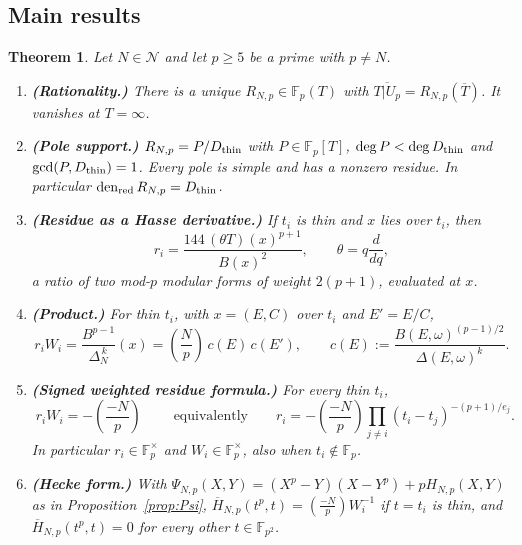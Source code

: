 \documentclass[11pt,a4paper]{article}
\numberwithin{equation}{section}
\newtheorem{maintheorem}[theorem]{Theorem}
\theoremstyle{definition}
\theoremstyle{remark}
\newcommand{\Fp}{\mathbb F_p}
\newcommand{\Fq}{\mathbb F_{p^2}}
\newcommand{\den}{\operatorname{den}_{\mathrm{red}}}
\newcommand{\Lp}[1]{\left(\frac{#1}{p}\right)}
\begin{document}
\subsection{Main results}
\begin{maintheorem}\label{thm:main}
Let $N\in\mathcal N$ and let $p\ge5$ be a prime with $p\ne N$.
\begin{enumerate}[label=\textup{(\alph*)}]
\item \textbf{(Rationality.)} There is a unique $R_{N,p}\in\Fp(T)$ with $\overline{T|U_p}=R_{N,p}(\overline T)$. It vanishes at $T=\infty$.
\item \textbf{(Pole support.)} $R_{N,p}=P/D_{\rm thin}$ with $P\in\Fp[T]$,
$\deg P<\deg D_{\rm thin}$ and $\gcd(P,D_{\rm thin})=1$. Every pole is simple and has a nonzero residue. In particular $\den R_{N,p}=D_{\rm thin}$.
\item \textbf{(Residue as a Hasse derivative.)} If $t_i$ is thin and $x$ lies over $t_i$, then
\[
r_i=\frac{144\,(\theta T)(x)^{p+1}}{B(x)^2},\qquad \theta=q\frac{d}{dq},
\]
a ratio of two mod-$p$ modular forms of weight $2(p+1)$, evaluated at $x$.
\item \textbf{(Product.)} For thin $t_i$, with $x=(E,C)$ over $t_i$ and $E'=E/C$,
\[
r_iW_i=\frac{B^{p-1}}{\Delta_N^{\,k}}(x)=\Lp{N}\,c(E)\,c(E'),\qquad
c(E):=\frac{B(E,\omega)^{(p-1)/2}}{\Delta(E,\omega)^{k}}.
\]
\item \textbf{(Signed weighted residue formula.)} For every thin $t_i$,
\[
\boxed{\;r_iW_i=-\Lp{-N}\;}\qquad\text{equivalently}\qquad
r_i=-\Lp{-N}\prod_{j\ne i}(t_i-t_j)^{-(p+1)/e_j}.
\]
In particular $r_i\in\Fp^\times$ and $W_i\in\Fp^\times$, also when $t_i\notin\Fp$.
\item \textbf{(Hecke form.)} With $\Psi_{N,p}(X,Y)=(X^p-Y)(X-Y^p)+pH_{N,p}(X,Y)$ as in
Proposition~\ref{prop:Psi}, $\overline H_{N,p}(t^p,t)=\Lp{-N}W_i^{-1}$ if $t=t_i$ is thin, and
$\overline H_{N,p}(t^p,t)=0$ for every other $t\in\Fq$.
\end{enumerate}
\end{maintheorem}
\end{document}
